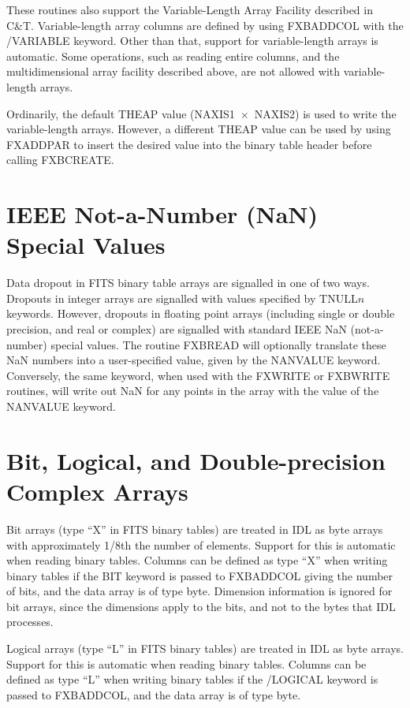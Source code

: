 These routines also support the Variable-Length Array Facility described in
C\&T\@.  Variable-length array columns are defined by using FXBADDCOL with the
/VARIABLE keyword.  Other than that, support for variable-length arrays is
automatic.  Some operations, such as reading entire columns, and the
multidimensional array facility described above, are not allowed with
variable-length arrays.

Ordinarily, the default THEAP value \mbox{(NAXIS1 $\times$ NAXIS2)} is used to
write the variable-length arrays.  However, a different THEAP value can be used
by using FXADDPAR to insert the desired value into the binary table header
before calling FXBCREATE.

\section{IEEE Not-a-Number (NaN) Special Values}

Data dropout in FITS binary table arrays are signalled in one of two ways.
Dropouts in integer arrays are signalled with values specified by TNULL$n$
keywords.  However, dropouts in floating point arrays (including single or
double precision, and real or complex) are signalled with standard IEEE NaN
(not-a-number) special values.  The routine FXBREAD will optionally translate
these NaN numbers into a user-specified value, given by the NANVALUE keyword.
Conversely, the same keyword, when used with the FXWRITE or FXBWRITE routines,
will write out NaN for any points in the array with the value of the NANVALUE
keyword.

\section{Bit, Logical, and Double-precision Complex Arrays}



Bit arrays (type ``X'' in FITS binary tables) are treated in IDL as byte arrays
with approximately 1/8th the number of elements.  Support for this is automatic
when reading binary tables.  Columns can be defined as type ``X'' when writing
binary tables if the BIT keyword is passed to FXBADDCOL giving the number of
bits, and the data array is of type byte.  Dimension information is ignored for
bit arrays, since the dimensions apply to the bits, and not to the bytes that
IDL processes.

Logical arrays (type ``L'' in FITS binary tables) are treated in IDL as byte
arrays.  Support for this is automatic when reading binary tables.  Columns can
be defined as type ``L'' when writing binary tables if the /LOGICAL keyword is
passed to FXBADDCOL, and the data array is of type byte.

